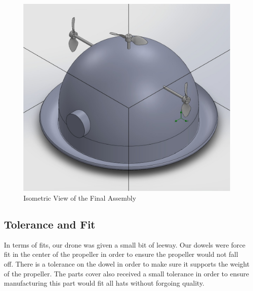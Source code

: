     \begin{figure}
        \centering
        \includegraphics[width=0.5\linewidth]{root/Models/Hat_Model.jpg}
        \caption{Isometric View of the Final Assembly}
        \label{fig:Hat Assembly}
    \end{figure}


\subsection{Tolerance and Fit}


In terms of fits, our drone was given a small bit of leeway. Our dowels were force fit in the center of the propeller in order to ensure the propeller would not fall off. There is a tolerance on the dowel in order to make sure it supports the weight of the propeller. The parts cover also received a small tolerance in order to ensure manufacturing this part would fit all hats without forgoing quality.